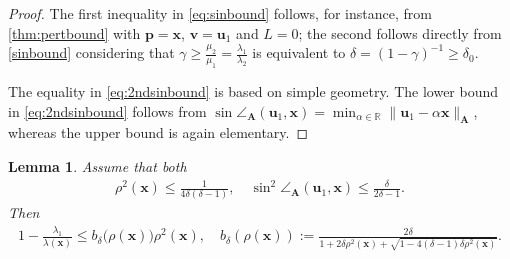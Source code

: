 \documentclass[a4paper,11pt,oneside]{amsart}
\newtheorem{lemma}[theorem]{Lemma}
\theoremstyle{definition}
\theoremstyle{remark}
\newcommand{\A}{\ten A}
\newcommand{\R}{\mathbb{R}}
\newcommand{\ten}[1]{\boldsymbol{#1}}
\newcommand{\bfun}{b}
\numberwithin{equation}{section}
\numberwithin{theorem}{section}
\begin{document}
\begin{proof}
 The first inequality in \eqref{eq:sinbound} follows, for instance, from \cref{thm:pertbound} with $\ten p = \ten x$, $\ten v= \ten u_1$ and  $L = 0$; the second follows directly from \cref{sinbound} considering that $\gamma \geq \frac{\mu_2}{\mu_1} = \frac{\lambda_1}{\lambda_2}$ is equivalent to $\delta = (1 - \gamma)^{-1} \geq \delta_0$. 

The equality in \eqref{eq:2ndsinbound} is based on simple geometry. The lower bound in \eqref{eq:2ndsinbound} follows from $\sin \angle_{\ten A}(\ten{u}_1,\ten x) = \min_{\alpha \in \R} \| \ten u_1 - \alpha \ten x\|_{\A}$, whereas the upper bound is again elementary.
%
\end{proof}


\begin{lemma}\label{lambdaqbound}
 Assume that both
 \begin{align}\label{lambdaqassumptions}
  \rho^2(\ten x) \leq \frac{1}{4 \delta (\delta-1)}, \quad  \sin^2\angle_{\A}(\ten{u}_1,\ten x) \leq \frac{\delta}{2\delta - 1}. 
 \end{align}
 Then
 \begin{align}\label{eq:bbetarho}
 1 - \frac{\lambda_1}{\lambda(\ten x)} \leq \bfun_\delta\big(\rho(\ten x) \bigr) \rho^2(\ten x), \quad \bfun_\delta( \rho(\ten x)) := 
\frac{2 \delta }{1 + 2 \delta \rho^2(\ten x) + \sqrt{1 - 4 (\delta - 1) \delta \rho^2(\ten x)}}. 
 \end{align}
\end{lemma}
\end{document}
